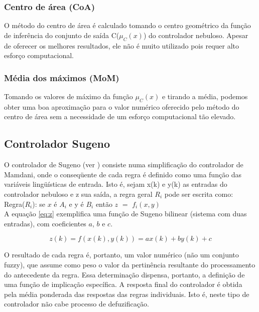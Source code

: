 \documentclass[
	twoside,				%
	twocolumn,				%
	english,				%
	brazil,					%
]{article}
\begin{document}
\subsubsection{Centro de área (CoA)}

O método do centro de área é calculado tomando o centro geométrico da função de inferência do conjunto de saída C($\mu_C(x)$) do controlador nebuloso. Apesar de oferecer os melhores resultados, ele não é muito utilizado pois requer alto esforço computacional.

\subsubsection{Média dos máximos (MoM)}

Tomando os valores de máximo da função $\mu_C(x)$ e tirando a média, podemos obter uma boa aproximação para o valor numérico oferecido pelo método do centro de área sem a necessidade de um esforço computacional tão elevado.

\subsection{Controlador Sugeno}

O controlador de Sugeno (ver \cite{TakagiSugeno:1983}) consiste numa simplificação do controlador de Mamdani, onde o conseqüente de cada regra é definido como uma função das variáveis lingüísticas de entrada. Isto é, sejam x(k) e y(k) as entradas do controlador nebuloso e z sua saída, a regra geral $R_i$ pode ser escrita como:\\
Regra($R_i$): se $x$ é $A_i$ e y é $B_i$ então $z$ $=$ $f_i(x,y)$\\
A equação \ref{eq:z} exemplifica uma função de Sugeno bilinear (sistema com duas entradas), com coeficientes $a$, $b$ e $c$.

\begin{equation}
z(k) = f(x(k),y(k)) = ax(k) + by(k) + c
\label{eq:z}
\end{equation}

O resultado de cada regra é, portanto, um valor numérico (não um conjunto fuzzy), que assume como peso o valor da pertinência resultante do processamento do antecedente da regra. Essa determinação dispensa, portanto, a definição de uma função de implicação específica. A resposta final do controlador é obtida pela média ponderada das respostas das regras individuais. Isto é, neste tipo de controlador não cabe processo de defuzificação.
\end{document}
